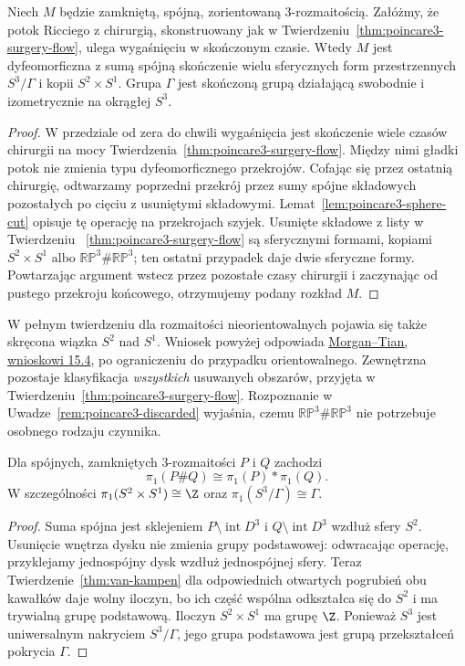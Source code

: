 \begin{wniosek}
\label{thm:poincare3-reconstruction}
Niech $M$ będzie zamkniętą, spójną,
zorientowaną $3$-rozmaitością. Załóżmy, że
potok Ricciego z chirurgią, skonstruowany
jak w Twierdzeniu~\ref{thm:poincare3-surgery-flow},
ulega wygaśnięciu w skończonym czasie.
Wtedy $M$ jest dyfeomorficzna z sumą spójną
skończenie wielu sferycznych form
przestrzennych $S^3/\Gamma$ i kopii
$S^2\times S^1$. Grupa $\Gamma$ jest
skończoną grupą działającą swobodnie
i izometrycznie na okrągłej $S^3$.
\end{wniosek}
\begin{proof}
W przedziale od zera do chwili wygaśnięcia
jest skończenie wiele czasów chirurgii na mocy
Twierdzenia~\ref{thm:poincare3-surgery-flow}.
Między nimi gładki potok nie zmienia typu
dyfeomorficznego przekrojów. Cofając się
przez ostatnią chirurgię, odtwarzamy poprzedni
przekrój przez sumy spójne składowych
pozostałych po cięciu z usuniętymi składowymi.
Lemat~\ref{lem:poincare3-sphere-cut}
opisuje tę operację na przekrojach szyjek.
Usunięte składowe z listy w Twierdzeniu
~\ref{thm:poincare3-surgery-flow} są sferycznymi
formami, kopiami $S^2\times S^1$ albo
$\mathbb{RP}^3\#\mathbb{RP}^3$; ten ostatni
przypadek daje dwie sferyczne formy.
Powtarzając argument wstecz przez pozostałe
czasy chirurgii i zaczynając od pustego
przekroju końcowego, otrzymujemy podany
rozkład $M$.
\end{proof}

W pełnym twierdzeniu dla rozmaitości
nieorientowalnych pojawia się także skręcona
wiązka $S^2$ nad $S^1$. Wniosek powyżej
odpowiada
\href{https://www.claymath.org/library/monographs/cmim03.pdf}
{Morgan--Tian, wnioskowi 15.4},
po ograniczeniu do przypadku orientowalnego.
Zewnętrzna pozostaje klasyfikacja
\emph{wszystkich} usuwanych obszarów,
przyjęta w Twierdzeniu~\ref{thm:poincare3-surgery-flow}.
Rozpoznanie w
Uwadze~\ref{rem:poincare3-discarded}
wyjaśnia, czemu $\mathbb{RP}^3\#\mathbb{RP}^3$
nie potrzebuje osobnego rodzaju czynnika.

\begin{lemat}
\label{lem:poincare3-pi1-sum}
Dla spójnych, zamkniętych $3$-rozmaitości
$P$ i $Q$ zachodzi
\[
 \pi_1(P\#Q)\cong\pi_1(P)*\pi_1(Q).
\]
W szczególności
$\pi_1(S^2\times S^1)\cong\Z$ oraz
$\pi_1(S^3/\Gamma)\cong\Gamma$.
\end{lemat}
\begin{proof}
Suma spójna jest sklejeniem
$P\setminus\operatorname{int}D^3$ i
$Q\setminus\operatorname{int}D^3$ wzdłuż
sfery $S^2$. Usunięcie wnętrza dysku
nie zmienia grupy podstawowej:
odwracając operację, przyklejamy
jednospójny dysk wzdłuż jednospójnej
sfery. Teraz Twierdzenie~\ref{thm:van-kampen}
dla odpowiednich otwartych pogrubień
obu kawałków daje wolny iloczyn, bo ich
część wspólna odkształca się do $S^2$
i ma trywialną grupę podstawową.
Iloczyn $S^2\times S^1$ ma grupę $\Z$.
Ponieważ $S^3$ jest uniwersalnym nakryciem
$S^3/\Gamma$, jego grupa podstawowa
jest grupą przekształceń pokrycia $\Gamma$.
\end{proof}

